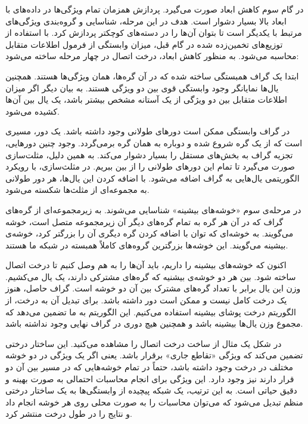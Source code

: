
در گام سوم کاهش ابعاد صورت می‌گیرد. پردازش همزمان تمام ویژگی‌ها در داده‌های با ابعاد بالا بسیار دشوار است. هدف در این مرحله، شناسایی و گروه‌بندی ویژگی‌های مرتبط با یکدیگر است تا بتوان آن‌ها را در دسته‌های کوچکتر پردازش کرد. با استفاده از توزیع‌های تخمین‌زده شده در گام قبل، میزان وابستگی از فرمول اطلاعات متقابل  محاسبه می‌شود. به منظور کاهش ابعاد، درخت اتصال در چهار مرحله ساخته می‌شود:


 ابتدا یک گراف همبستگی ساخته شده که در آن گره‌ها، همان ویژگی‌ها هستند. همچنین یال‌ها نمایانگر وجود وابستگی قوی بین دو ویژگی هستند. به بیان دیگر اگر میزان اطلاعات متقابل بین دو ویژگی از یک آستانه مشخص بیشتر باشد، یک یال بین آن‌ها کشیده می‌شود.

 در گراف وابستگی ممکن است دورهای طولانی وجود داشته باشد. یک دور، مسیری است که از یک گره شروع شده و دوباره به همان گره برمی‌گردد. وجود چنین دورهایی، تجزیه گراف به بخش‌های مستقل را بسیار دشوار می‌کند. به همین دلیل، مثلت‌سازی صورت می‌گیرد تا تمام این دورهای طولانی را از بین ببریم. در مثلث‌سازی، با رویکرد الگوریتمی یال‌هایی به گراف اضافه می‌شود.  با اضافه کردن این یال‌ها، هر دور طولانی به مجموعه‌ای از مثلث‌ها شکسته می‌شود.

 در مرحله‌ی سوم «خوشه‌های بیشینه» شناسایی می‌شوند. به زیرمجموعه‌ای از گره‌های گراف که در آن هر گره به تمام گره‌های دیگر آن زیرمجموعه متصل است، خوشه می‌گویند. به خوشه‌ای که توان با اضافه کردن گره دیگری آن را بزرگتر کرد، خوشه‌ی بیشینه می‌گویند. این خوشه‌ها بزرگترین گروه‌های کاملاً همبسته در شبکه ما هستند.

 اکنون که خوشه‌های بیشینه را داریم، باید آن‌ها را به هم وصل کنیم تا درخت اتصال ساخته شود. بین هر دو خوشه‌ی بیشنیه که گره‌های مشترکی دارند، یک یال می‌کشیم. وزن این یال برابر با تعداد گره‌های مشترک بین آن دو خوشه است. گراف حاصل، هنوز یک درخت کامل نیست و ممکن است دور داشته باشد. برای تبدیل آن به درخت، از الگوریتم درخت پوشای بیشینه استفاده می‌کنیم. این الگوریتم به ما تضمین می‌دهد که مجموع وزن یال‌ها بیشینه باشد و همچنین هیچ دوری در گراف نهایی وجود نداشته باشد.


در شکل  یک مثال از ساخت درخت اتصال را مشاهده می‌کنید. این ساختار درختی تضمین می‌کند که ویژگی «تقاطع جاری» برقرار باشد. یعنی اگر یک ویژگی در دو خوشه مختلف در درخت وجود داشته باشد، حتماً در تمام خوشه‌هایی که در مسیر بین آن دو قرار دارند نیز وجود دارد. این ویژگی برای انجام محاسبات احتمالی به صورت بهینه و دقیق حیاتی است. به این ترتیب، یک شبکه پیچیده از وابستگی‌ها به یک ساختار درختی منظم تبدیل می‌شود که می‌توان محاسبات را به صورت محلی روی هر خوشه انجام داد و نتایج را در طول درخت منتشر کرد.

